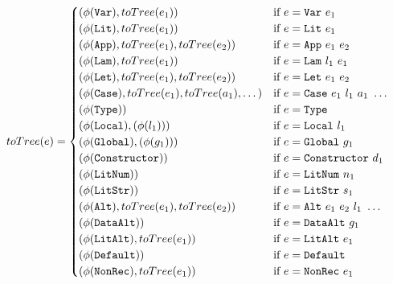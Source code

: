 \begin{figure}
  \begin{align*}
    toTree(e) &=
    \begin{cases}
      (\feature{\CVar},     toTree(e_1))                                 & \text{if $e = \CVar\ e_1$} \\
      (\feature{\CLit},     toTree(e_1))                                 & \text{if $e = \CLit\ e_1$} \\
      (\feature{\CApp},     toTree(e_1), toTree(e_2))                    & \text{if $e = \CApp\ e_1\ e_2$} \\
      (\feature{\CLam},     toTree(e_1))                                 & \text{if $e = \CLam\ l_1\ e_1$} \\
      (\feature{\CLet},     toTree(e_1), toTree(e_2))                    & \text{if $e = \CLet\ e_1\ e_2$} \\
      (\feature{\CCase},    toTree(e_1), toTree(a_1), \dots)             & \text{if $e = \CCase\ e_1\ l_1\ a_1\ \dots$} \\
      (\feature{\CType})                                                & \text{if $e = \CType$} \\
      (\feature{\CLocal},   (\feature{l_1}))                            & \text{if $e = \CLocal\ l_1$} \\
      (\feature{\CGlobal},  (\feature{g_1}))                            & \text{if $e = \CGlobal\ g_1$} \\
      (\feature{\CConstructor})                                         & \text{if $e = \CConstructor\ d_1$} \\
      (\feature{\CLitNum})                                              & \text{if $e = \CLitNum\ n_1$} \\
      (\feature{\CLitStr})                                              & \text{if $e = \CLitStr\ s_1$} \\
      (\feature{\CAlt},     toTree(e_1), toTree(e_2))                   & \text{if $e = \CAlt\ e_1\ e_2\ l_1\ \dots$}  \\
      (\feature{\CDataAlt})                                             & \text{if $e = \CDataAlt\ g_1$}  \\
      (\feature{\CLitAlt},  toTree(e_1))                                & \text{if $e = \CLitAlt\ e_1$}  \\
      (\feature{\CDefault})                                             & \text{if $e = \CDefault$}  \\
      (\feature{\CNonRec},  toTree(e_1))                                & \text{if $e = \CNonRec\ e_1$}  \\

\end{cases}
\end{align*}
\end{figure}
